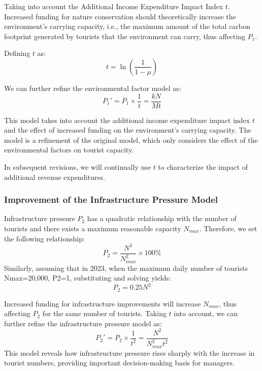 \documentclass{mcmthesis}
\begin{document}
{Taking into account the Additional Income Expenditure Impact Index $t$. Increased funding for nature conservation should theoretically increase the environment's carrying capacity, i.e., the maximum amount of the total carbon footprint generated by tourists that the environment can carry, thus affecting  $P_1$.} 

{Defining $t$ as:}
\begin{equation}
  t = \ln\left(\frac{1}{1 - \mu}\right)
  \end{equation}

{We can further refine the environmental factor model as:}
\begin{equation}
  P_1'=P_1\times\frac{1}{t}=\frac{kN}{Mt}\label{eq:p1}
\end{equation}

{This model takes into account the additional income expenditure impact index $t$ and the effect of increased funding on the environment's carrying capacity. The model is a refinement of the original model, which only considers the effect of the environmental factors on tourist capacity.}

{In subsequent revisions, we will continually use $t$ to characterize the impact of additional revenue expenditures.}
\subsubsection{Improvement of the Infrastructure Pressure Model}
{Infrastructure pressure $P_2$ has a quadratic
relationship with the number of tourists and there exists a maximum reasonable
capacity $N_{max}$. Therefore, we set the following relationship:}
\begin{equation}
  P_2=\frac{N^2}{N_{max}^2}\times 100\%
\end{equation}
{Similarly, assuming that in 2023, when the
maximum daily number of tourists Nmax=20,000, P2=1, substituting and solving
yields:}
\begin{equation}
  P_2=0.25 N^2
\end{equation}

{Increased funding for infrastructure improvements will increase $N_{max}$, thus affecting $P_2$ for the same number of tourists. Taking $t$ into account, we can further refine the infrastructure pressure model as:}
\begin{equation}
  P_2'=P_2\times\frac{1}{t^2}=\frac{N^2}{N_{max}^2t^2}\label{eq:p2}
\end{equation}
{This model reveals how infrastructure pressure
rises sharply with the increase in tourist numbers, providing important
decision-making basis for managers.}
\end{document}

